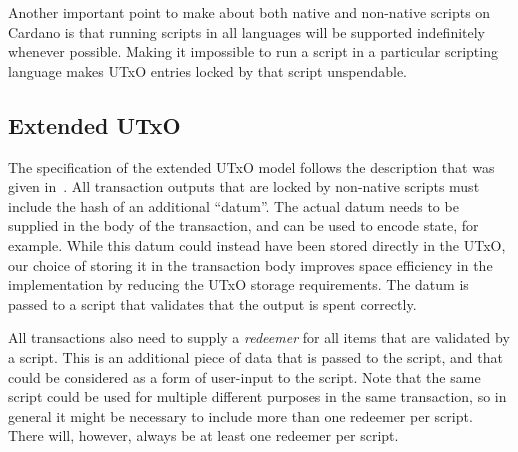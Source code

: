 Another important point to make about both native and non-native scripts on Cardano is that
running scripts in all languages will be supported indefinitely whenever possible.
Making it impossible to run a script in a particular scripting language
makes UTxO entries locked by that script unspendable.

\subsection{Extended UTxO}

The specification of the extended UTxO model follows the description that was given in~\cite{plutus_eutxo}.
All transaction outputs that are locked by non-native scripts must include the hash of an additional ``datum''. The actual datum needs to be supplied in the body of the transaction, and can be used to encode state, for example.
While this datum could instead have been stored directly in the UTxO, our choice of storing it in the transaction body improves space efficiency in the implementation by reducing the UTxO storage requirements. The datum is passed to a script that validates that the output is spent correctly.

All transactions also need to supply a \emph{redeemer} for all items that are validated by a script. This is an additional piece of data that is passed to the script, and that could be considered as a form of user-input to the script. Note that the same script could be used for multiple different purposes in the same transaction, so in general it might be necessary to include more than one redeemer per script.
There will, however, always be at least one redeemer per script.
